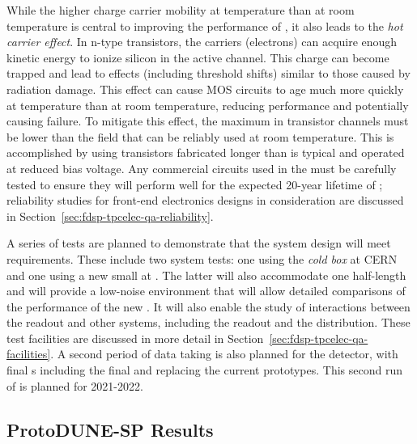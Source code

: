 While the higher charge carrier mobility at  temperature than at room temperature is central to improving the performance of , it also leads to the \textit{hot carrier effect}.  In n-type  transistors, the carriers (electrons) can acquire enough kinetic energy to ionize silicon in the active channel.  This charge can become trapped and lead to effects (including threshold shifts) similar to those caused by radiation damage.  This effect can cause MOS circuits to age much more quickly at  temperature than at room temperature, reducing performance and potentially causing failure.  To mitigate this effect, the maximum \efield in transistor channels must be lower than the field that can be reliably used at room temperature.  This is accomplished by using transistors fabricated longer than is typical and operated at reduced bias voltage.  Any commercial circuits used in the  must be carefully tested to ensure they will perform well for the expected \num{20}-year lifetime of ; reliability studies for front-end electronics designs in consideration are discussed in Section~\ref{sec:fdsp-tpcelec-qa-reliability}.

A series of tests are planned to demonstrate that the  system design will meet  requirements. These include two system tests: one using the  \textit{cold box} at CERN and one using a new small  at \fnal. The latter will also accommodate one half-length   and will provide a low-noise environment that will allow detailed comparisons of the performance of the new . It will also enable the study of interactions between the  readout and other systems, including the  readout and the  distribution. These test facilities are discussed in more detail in Section~\ref{sec:fdsp-tpcelec-qa-facilities}. A second period of data taking is also planned for the  detector, with final s including the final  and  replacing the current prototypes. This second run of  is planned for 2021-2022.


\subsection{ProtoDUNE-SP Results}
\label{sec:fdsp-tpcelec-overview-pdune}

